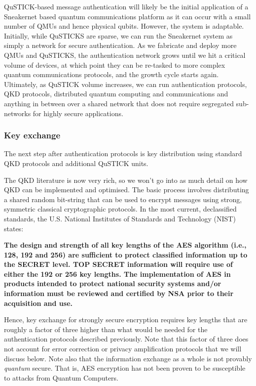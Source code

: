 \documentclass[twocolumn, aps, rmp, amsmath, amssymb, nofootinbib, superscriptaddress, longbibliography, floatfix, table-of-contents, eqsecnum]{revtex4-2}
\begin{document}
QuSTICK-based message authentication will likely be the initial application of a Sneakernet based quantum communications platform as it can occur with a small number of QMUs and hence physical qubits. However, the system is adaptable. Initially, while QuSTICKS are sparse, we can run the Sneakernet system as simply a network for secure authentication. As we fabricate and deploy more QMUs and QuSTICKS, the authentication network grows until we hit a critical volume of devices, at which point they can be re-tasked to more complex quantum communications protocols, and the growth cycle starts again. Ultimately, as QuSTICK volume increases, we can run authentication protocols, QKD protocols, distributed quantum computing and communications and anything in between over a shared network that does not require segregated sub-networks for highly secure applications. 

\subsubsection{Key exchange}

The next step after authentication protocols is key distribution using standard QKD protocols and additional QuSTICK units. 

The QKD literature is now very rich, so we won't go into as much detail on how QKD can be implemented and optimised. The basic process involves distributing a shared random bit-string that can be used to encrypt messages using strong, symmetric classical cryptographic protocols. In the most current, declassified standards, the U.S. National Institutes of Standards and Technology (NIST) states:

\textbf{The design and strength of all key lengths of the AES algorithm (i.e., 128, 192 and 256) are sufficient to protect classified information up to the SECRET level. TOP SECRET information will require use of either the 192 or 256 key lengths. The implementation of AES in products intended to protect national security systems and/or information must be reviewed and certified by NSA prior to their acquisition and use.}

Hence, key exchange for strongly secure encryption requires key lengths that are roughly a factor of three higher than what would be needed for the authentication protocols described previously. Note that this factor of three does not account for error correction or privacy amplification protocols that we will discuss below. Note also that the information exchange as a whole is not provably \textit{quantum} secure. That is, AES encryption has not been proven to be susceptible to attacks from Quantum Computers.
\end{document}
